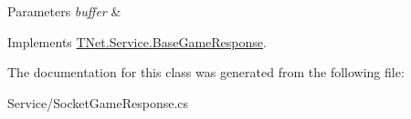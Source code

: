 \begin{DoxyParams}{Parameters}
{\em buffer} & \\
\hline
\end{DoxyParams}


Implements \mbox{\hyperlink{class_t_net_1_1_service_1_1_base_game_response_a2ede5b36253063e68dbe5553a95bf1e2}{T\+Net.\+Service.\+Base\+Game\+Response}}.



The documentation for this class was generated from the following file\+:\begin{DoxyCompactItemize}
\item 
Service/Socket\+Game\+Response.\+cs\end{DoxyCompactItemize}
